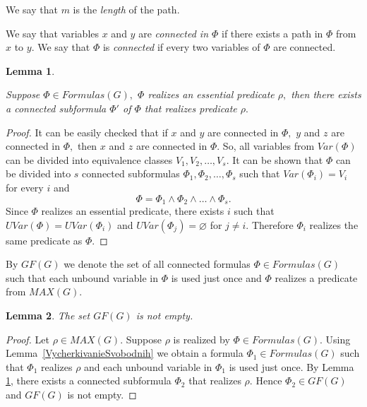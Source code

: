 \documentclass{au}
\theoremstyle{plain}
\newtheorem{lemma}{Lemma}
\theoremstyle{definition}
\theoremstyle{remark}
\numberwithin{equation}{section}
\begin{document}
We say that $m$ is the \emph{length} of the path.

We say that variables $x$ and $y$ are \emph{connected in $\Phi$} if there exists a path in $\Phi$
from $x$ to $y.$
We say that $\Phi$ is \emph{connected} if every two variables of $\Phi$ are connected.

\begin{lemma} \label{svyasnyaformula}

Suppose $\Phi\in Formulas(G),$
$\Phi$ realizes an essential predicate $\rho,$
then there exists a connected subformula $\Phi'$ of $\Phi$
that realizes predicate $\rho.$

\end{lemma}

\begin{proof}

It can be easily checked that if $x$ and $y$ are connected in $\Phi,$
$y$ and $z$ are connected in $\Phi,$ then $x$ and $z$ are connected in $\Phi.$
So, all variables from $Var(\Phi)$ can be divided into equivalence classes
$V_{1}, V_{2}, \ldots, V_{s}.$
It can be shown that $\Phi$ can be divided into $s$ connected subformulas
$\Phi_{1},\Phi_{2},\ldots,\Phi_{s}$
such that
$Var(\Phi_{i}) = V_{i}$ for every $i$ and
$$\Phi = \Phi_{1}\wedge \Phi_{2} \wedge\ldots\wedge\Phi_{s}.$$
Since $\Phi$ realizes an essential predicate,
there exists $i$ such that
$UVar(\Phi) = UVar(\Phi_{i})$
and $UVar(\Phi_{j})=\varnothing$ for $j\neq i.$
Therefore $\Phi_{i}$ realizes the same predicate as $\Phi.$

\end{proof}

By $GF(G)$ we denote the set of all connected formulas $\Phi\in Formulas(G)$ such that
each unbound variable in $\Phi$ is used just once and
$\Phi$ realizes a predicate from $MAX(G).$

\begin{lemma}

The set $GF(G)$ is not empty.

\end{lemma}

\begin{proof}

Let $\rho\in MAX(G).$
Suppose $\rho$ is realized by $\Phi\in Formulas(G).$
Using Lemma~\ref{VycherkivanieSvobodnih} we obtain
a formula $\Phi_{1}\in Formulas(G)$
such that $\Phi_{1}$ realizes $\rho$ and
each unbound variable in $\Phi_{1}$ is used just once.
By Lemma \ref{svyasnyaformula}, there exists a connected subformula
$\Phi_{2}$ that realizes $\rho.$
Hence $\Phi_{2}\in GF(G)$ and $GF(G)$ is not empty.

\end{proof}
\end{document}
